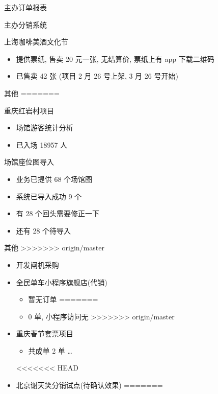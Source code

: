 \documentclass[presentation, bigger]{beamer}
\begin{document}
\begin{frame}[label={sec:orgb81fa7f}]{主办订单报表}
\begin{frame}[label={sec:org37bc7b4}]{主办分销系统}
\begin{frame}[label={sec:org97a9a4c}]{上海咖啡美酒文化节}
\begin{itemize}
\item 提供票纸, 售卖 20 元一张, 无结算价, 票纸上有 app 下载二维码
\item 已售卖 42 张 (项目 2 月 26 号上架, 3 月 26 号开始)
\end{itemize}
\end{frame}

\begin{frame}[label={sec:org82cc8d4}]{其他}
=======
\label{sec:org0bf0f40}
\begin{frame}[label={sec:org51dea6a}]{重庆红岩村项目}
\begin{itemize}
\item 场馆游客统计分析
\item 已入场 18957 人
\end{itemize}
\end{frame}

\begin{frame}[label={sec:org163bf42}]{场馆座位图导入}
\begin{itemize}
\item 业务已提供 68 个场馆图
\item 系统已导入成功 9 个
\item 有 28 个回头需要修正一下
\item 还有 28 个待导入
\end{itemize}
\end{frame}

\begin{frame}[label={sec:orgf9b8711}]{其他}
>>>>>>> origin/master
\begin{itemize}
\item 开发闸机采购
\item 全民单车小程序旗舰店(代销)
\begin{itemize}
<<<<<<< HEAD
\item 暂无订单
=======
\item 0 单, 小程序访问无
>>>>>>> origin/master
\end{itemize}
\item 重庆春节套票项目
\begin{itemize}
\item 共成单 2 单 \ldots{}
\end{itemize}
<<<<<<< HEAD
\item 北京谢天笑分销试点(待确认效果)
=======
\end{itemize}
\end{frame}


\end{frame}
\end{frame}
\end{frame}
\end{document}
